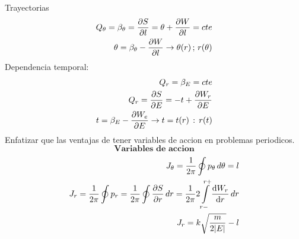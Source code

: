 \documentclass[12pt]{article}
\newcommand{\eq}[1]{\[#1\]}
\newcommand{\inv}[1]{\frac{1}{#1}}
\newcommand{\intt}[2]{\int\limits_{#1}^{#2}}
\begin{document}
Trayectorias
\begin{align}
Q_\theta=\beta_\theta=\pdv{S}{l}=\theta +\pdv{W}{l}=cte\\
\theta= \beta_\theta - \pdv{W}{l}\rightarrow \theta(r) \,;\,r(\theta)
\end{align}
Dependencia temporal:
\begin{align}
Q_r=\beta_E = cte\\
Q_r=\pdv{S}{E}= -t+\pdv{W_r}{E}\\
t= \beta_E - \pdv{W_e}{E}\rightarrow t=t(r)\,:\, r(t)
\end{align}
Enfatizar que las ventajas de tener variables de accion en problemas periodicos.
\eq{\textbf{Variables de accion}}
\begin{align}
J_\theta = \inv{2\pi} \oint p_\theta \, d\theta =l\\
J_r= 	 \inv{2\pi} \oint p_r = \inv{2\pi} \oint \pdv{S}{r} \, dr = \inv{2\pi} 2\intt{r-}{r+} \dv{W_r}{r}\, dr\\
J_r =  k \sqrt{\frac{m}{2|E|}}-l
\end{align}
\end{document}
